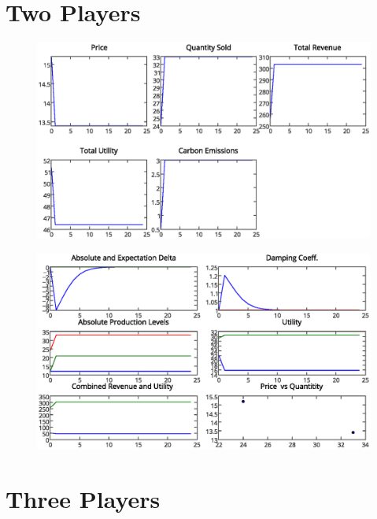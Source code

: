 \documentclass[12pt]{article}
\begin{document}
\newpage


	\section{Two Players}

		\begin{figure}[ht!]
			\begin{center}
			\includegraphics[scale = .6]{2playertotals.eps}
			\end{center}
		\end{figure}


		\begin{figure}[ht!]
			\begin{center}
			\includegraphics[scale = .6]{2player.eps}
			\end{center}
		\end{figure}


\newpage

	\section{Three Players}
\end{document}
